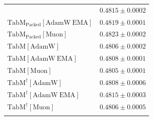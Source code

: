 \begin{longtable}{p{}p{}}
{\begin{tabular}{ll}
{\footnotesize $\mathrm{TabM_{\text{Packed}}[AdamW]}$ } & {\footnotesize$0.4815 \pm 0.0002$}\\ 
{\footnotesize $\mathrm{TabM_{\text{Packed}}[AdamW\ EMA]}$ } & {\footnotesize$0.4819 \pm 0.0001$}\\ 
{\footnotesize $\mathrm{TabM_{\text{Packed}}[Muon]}$ } & {\footnotesize$0.4823 \pm 0.0002$}\\ 
{\footnotesize $\mathrm{TabM[AdamW]}$ } & {\footnotesize$0.4806 \pm 0.0002$}\\ 
{\footnotesize $\mathrm{TabM[AdamW\ EMA]}$ } & {\footnotesize$0.4808 \pm 0.0001$}\\ 
{\footnotesize $\mathrm{TabM[Muon]}$ } & {\footnotesize$0.4805 \pm 0.0001$}\\ 
{\footnotesize $\mathrm{TabM^\dagger[AdamW]}$ } & {\footnotesize$0.4808 \pm 0.0006$}\\ 
{\footnotesize $\mathrm{TabM^\dagger[AdamW\ EMA]}$ } & {\footnotesize$0.4815 \pm 0.0003$}\\ 
{\footnotesize $\mathrm{TabM^\dagger[Muon]}$ } & {\footnotesize$0.4806 \pm 0.0005$}\\ 
\bottomrule
\end{tabular}}

&

\topalign{
\centering
\setlength\tabcolsep{2.5pt}
\renewcommand{\arraystretch}{0.8}
\begin{tabular}{ll}


\end{tabular}}
\end{longtable}

